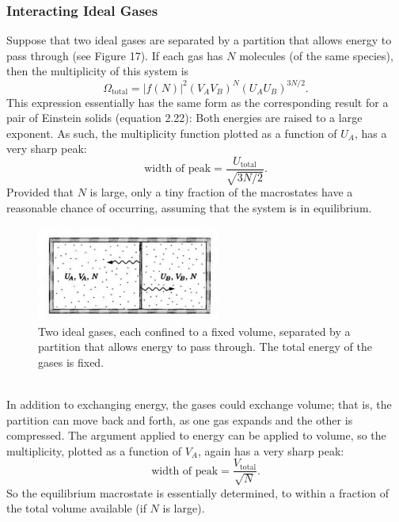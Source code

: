 \documentclass[11pt]{exam}
\begin{document}
\subsubsection*{Interacting Ideal Gases}
Suppose that two ideal gases are separated by a partition that allows energy to pass through (see Figure 17). If each gas has $N$ molecules (of the same species), then the multiplicity of this system is 
\begin{equation}\tag{2.42}
\Omega_{\text{total}}=|f(N)|^2(V_AV_B)^N(U_AU_B)^{3N/2}.    
\end{equation}
This expression essentially has the same form as the corresponding result for a pair of Einstein solids (equation 2.22): Both energies are raised to a large exponent. As such, the multiplicity function plotted as a function of $U_A$, has a very sharp peak:
\begin{equation}\tag{2.43}
\text{width of peak}=\frac{U_{\text{total}}}{\sqrt{3N/2}}. 
\end{equation}
Provided that $N$ is large, only a tiny fraction of the macrostates have a reasonable chance of occurring, assuming that the system is in equilibrium. 
\begin{figure}[htp]
    \centering
    \includegraphics[width=6cm]{figure17.png}
    \caption{Two ideal gases, each confined to a fixed volume, separated by a partition that allows energy to pass through. The total energy of the gases is fixed.}
\label{fig:identitical-molecules}
\end{figure}\\
\hspace*{10mm}In addition to exchanging energy, the gases could exchange volume; that is, the partition can move back and forth, as one gas expands and the other is compressed. The argument applied to energy can be applied to volume, so the multiplicity, plotted as a function of $V_A$, again has a very sharp peak:
\begin{equation}\tag{2.44}
\text{width of peak}=\frac{V_{\text{total}}}{\sqrt{N}}. 
\end{equation}
So the equilibrium macrostate is essentially determined, to within a fraction of the total volume available (if $N$ is large). 
\end{document}
